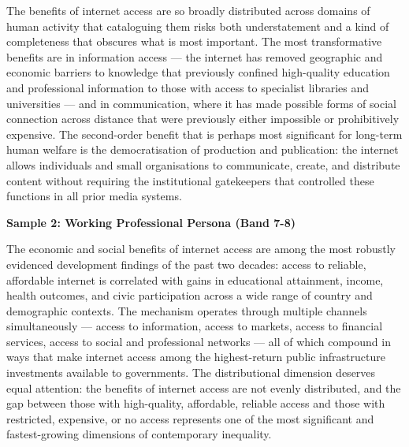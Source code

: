 The benefits of internet access are so broadly distributed across domains of human activity that cataloguing them risks both understatement and a kind of completeness that obscures what is most important. The most transformative benefits are in information access — the internet has removed geographic and economic barriers to knowledge that previously confined high-quality education and professional information to those with access to specialist libraries and universities — and in communication, where it has made possible forms of social connection across distance that were previously either impossible or prohibitively expensive. The second-order benefit that is perhaps most significant for long-term human welfare is the democratisation of production and publication: the internet allows individuals and small organisations to communicate, create, and distribute content without requiring the institutional gatekeepers that controlled these functions in all prior media systems.

\textbf{Sample 2: Working Professional Persona (Band 7-8)}

The economic and social benefits of internet access are among the most robustly evidenced development findings of the past two decades: access to reliable, affordable internet is correlated with gains in educational attainment, income, health outcomes, and civic participation across a wide range of country and demographic contexts. The mechanism operates through multiple channels simultaneously — access to information, access to markets, access to financial services, access to social and professional networks — all of which compound in ways that make internet access among the highest-return public infrastructure investments available to governments. The distributional dimension deserves equal attention: the benefits of internet access are not evenly distributed, and the gap between those with high-quality, affordable, reliable access and those with restricted, expensive, or no access represents one of the most significant and fastest-growing dimensions of contemporary inequality.

\separator


